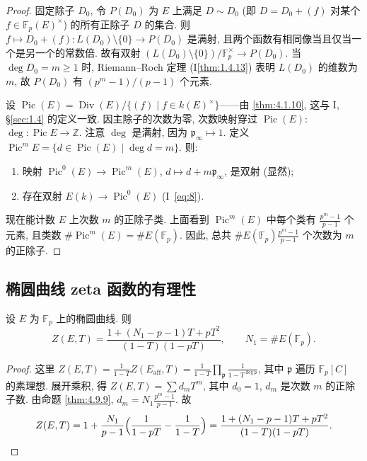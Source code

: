 \begin{proof}
固定除子 $D_0$, 令 $P(D_0)$ 为 $E$ 上满足 $D\sim D_0$ (即 $D = D_0 + (f)$ 对某个 $f\in\mathbb{F}_p(E)^{\times}$) 的所有正除子 $D$ 的集合. 则 $f\mapsto D_0 + (f)\colon L(D_0)\setminus\{0\}\to P(D_0)$ 是满射, 且两个函数有相同像当且仅当一个是另一个的常数倍. 故有双射 $(L(D_0)\setminus\{0\})/\mathbb{F}_p^{\times}\to P(D_0)$. 当 $\deg D_0 = m\ge 1$ 时, Riemann--Roch 定理 (I\ref{thm:1.4.13}) 表明 $L(D_0)$ 的维数为 $m$, 故 $P(D_0)$ 有 $(p^m-1)/(p-1)$ 个元素.

设 $\operatorname{Pic}(E) = \operatorname{Div}(E)/\{(f) \mid f\in k(E)^{\times}\}$——由 \ref{thm:4.1.10}, 这与 I, \S\ref{sec:1.4} 的定义一致. 因主除子的次数为零, 次数映射穿过 $\operatorname{Pic}(E)$: $\deg\colon\operatorname{Pic}E\to\mathbb{Z}$. 注意 $\deg$ 是满射, 因为 $\mathfrak{p}_\infty\mapsto 1$. 定义 $\operatorname{Pic}^mE = \{d\in\operatorname{Pic}(E) \mid \deg d = m\}$. 则:
\begin{enumerate}[label=\textup{(\alph*)}]
\item 映射 $\operatorname{Pic}^0(E)\to\operatorname{Pic}^m(E)$, $d\mapsto d + m\mathfrak{p}_\infty$, 是双射 (显然);
\item 存在双射 $E(k)\to\operatorname{Pic}^0(E)$ (I~\eqref{eq:8}).
\end{enumerate}
现在能计数 $E$ 上次数 $m$ 的正除子类. 上面看到 $\operatorname{Pic}^m(E)$ 中每个类有 $\frac{p^m-1}{p-1}$ 个元素, 且类数 $\#\operatorname{Pic}^m(E) = \#E(\mathbb{F}_p)$. 因此, 总共 $\#E(\mathbb{F}_p)\frac{p^m-1}{p-1}$ 个次数为 $m$ 的正除子.
\end{proof}

\subsection*{椭圆曲线 zeta 函数的有理性}

\begin{theorem} \label{thm:4.9.10} 
设 $E$ 为 $\mathbb{F}_p$ 上的椭圆曲线. 则
\[
Z(E, T) = \frac{1 + (N_1 - p - 1)T + pT^2}{(1-T)(1-pT)}, \qquad N_1 = \#E(\mathbb{F}_p).
\]
\end{theorem}

\begin{proof}
这里 $Z(E, T) = \frac{1}{1-T}Z(E_{\mathrm{aff}}, T) = \frac{1}{1-T}\prod_{\mathfrak{p}}\frac{1}{1 - T^{\deg\mathfrak{p}}}$, 其中 $\mathfrak{p}$ 遍历 $\mathbb{F}_p[C]$ 的素理想. 展开乘积, 得 $Z(E, T) = \sum d_mT^m$, 其中 $d_0 = 1$, $d_m$ 是次数 $m$ 的正除子数. 由命题 \ref{thm:4.9.9}, $d_m = N_1\frac{p^m-1}{p-1}$. 故
\[
Z(E, T) = 1 + \frac{N_1}{p-1}\Bigl(\frac{1}{1-pT} - \frac{1}{1-T}\Bigr)
= \frac{1 + (N_1 - p - 1)T + pT^2}{(1-T)(1-pT)}.
\]
\end{proof}

